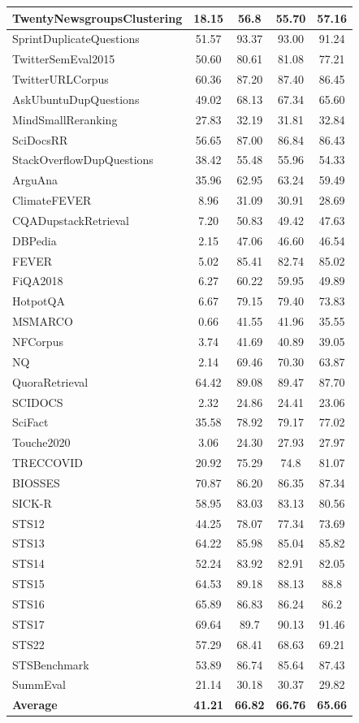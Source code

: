 \documentclass{article}
\begin{document}
\begin{longtable}{l|cccc}
TwentyNewsgroupsClustering & 18.15 & 56.8 & 55.70 & 57.16 \\
\midrule
SprintDuplicateQuestions & 51.57 & 93.37 & 93.00 & 91.24 \\
TwitterSemEval2015 & 50.60 & 80.61 & 81.08 & 77.21 \\
TwitterURLCorpus & 60.36 & 87.20 & 87.40 & 86.45 \\
\midrule
AskUbuntuDupQuestions & 49.02 & 68.13 & 67.34 & 65.60 \\
MindSmallReranking & 27.83 & 32.19 & 31.81 & 32.84 \\
SciDocsRR & 56.65 & 87.00 & 86.84 & 86.43 \\
StackOverflowDupQuestions & 38.42 & 55.48 & 55.96 & 54.33 \\
\midrule
ArguAna & 35.96 & 62.95 & 63.24 & 59.49 \\
ClimateFEVER & 8.96 & 31.09 & 30.91 & 28.69 \\
CQADupstackRetrieval & 7.20 & 50.83 & 49.42 & 47.63 \\
DBPedia & 2.15 & 47.06 & 46.60 & 46.54 \\
FEVER & 5.02 & 85.41 & 82.74 & 85.02 \\
FiQA2018 & 6.27 & 60.22 & 59.95 & 49.89 \\
HotpotQA & 6.67 & 79.15 & 79.40 & 73.83 \\
MSMARCO & 0.66 & 41.55 & 41.96 & 35.55 \\
NFCorpus & 3.74 & 41.69 & 40.89 & 39.05 \\
NQ & 2.14 & 69.46 & 70.30 & 63.87 \\
QuoraRetrieval & 64.42 & 89.08 & 89.47 & 87.70 \\
SCIDOCS & 2.32 & 24.86 & 24.41 & 23.06 \\
SciFact & 35.58 & 78.92 & 79.17 & 77.02 \\
Touche2020 & 3.06 & 24.30 & 27.93 & 27.97 \\
TRECCOVID & 20.92 & 75.29 & 74.8 & 81.07 \\
\midrule
BIOSSES & 70.87 & 86.20 & 86.35 & 87.34 \\
SICK-R & 58.95 & 83.03 & 83.13 & 80.56 \\
STS12 & 44.25 & 78.07 & 77.34 & 73.69 \\
STS13 & 64.22 & 85.98 & 85.04 & 85.82 \\
STS14 & 52.24 & 83.92 & 82.91 & 82.05 \\
STS15 & 64.53 & 89.18 & 88.13 & 88.8 \\
STS16 & 65.89 & 86.83 & 86.24 & 86.2 \\
STS17 & 69.64 & 89.7 & 90.13 & 91.46 \\
STS22 & 57.29 & 68.41 & 68.63 & 69.21 \\
STSBenchmark & 53.89 & 86.74 & 85.64 & 87.43 \\
\midrule
SummEval & 21.14 & 30.18 & 30.37 & 29.82 \\
\midrule
\textbf{Average} & \textbf{41.21} & \textbf{66.82} & \textbf{66.76} & \textbf{65.66} \\
\bottomrule
\end{longtable}
\end{document}

